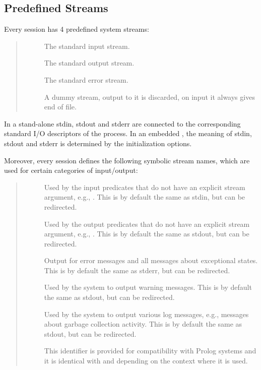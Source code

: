 \subsection{Predefined Streams}
Every {\eclipse} session has 4 predefined system streams:
\label{streams}
\begin{quote}
\begin{description}
\item[]
  The standard input stream.
\item[]
  The standard output stream.
\item[]
  The standard error stream.

\item[]
  A dummy stream, output to it is discarded, on input it always
  gives end of file.
\end{description}
\end{quote}
In a stand-alone {\eclipse} stdin, stdout and stderr are connected
to the corresponding standard I/O descriptors of the process.
In an embedded {\eclipse}, the meaning of stdin, stdout and
stderr is determined by the {\eclipse} initialization options.


Moreover, every {\eclipse} session defines the following symbolic stream
names, which are used for certain categories of input/output:
\begin{quote}
\begin{description}
\item[]
  Used by the input predicates that do not have an explicit stream argument,
  e.g., .
  This is by default the same as stdin, but can be redirected.
\item[]
  Used by the output predicates that do not have an explicit stream argument,
  e.g., .
  This is by default the same as stdout, but can be redirected.
\item[]
  Output for error messages and all messages about exceptional states.
  This is by default the same as stderr, but can be redirected.
\item[]
  Used by the system to output warning messages.
  This is by default the same as stdout, but can be redirected.
\item[]
  Used by the system to output various log messages, e.g., messages about
  garbage collection activity.
  This is by default the same as stdout, but can be redirected.
\item[]
  This identifier is provided for compatibility with Prolog
  systems and it is identical with  and 
  depending on the context where it is used.
\end{description}
\end{quote}

